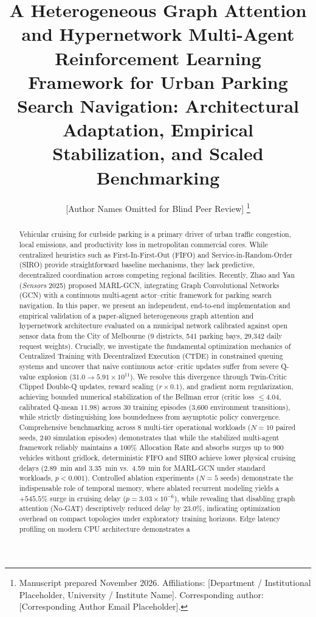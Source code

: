 \documentclass[journal]{IEEEtran}
\begin{document}
\title{A Heterogeneous Graph Attention and Hypernetwork Multi-Agent Reinforcement Learning Framework for Urban Parking Search Navigation: Architectural Adaptation, Empirical Stabilization, and Scaled Benchmarking}

\author{[Author Names Omitted for Blind Peer Review]%
\thanks{Manuscript prepared November 2026. Affiliations: [Department / Institutional Placeholder, University / Institute Name]. Corresponding author: [Corresponding Author Email Placeholder].}}

\maketitle

\begin{abstract}
Vehicular cruising for curbside parking is a primary driver of urban traffic congestion, local emissions, and productivity loss in metropolitan commercial cores. While centralized heuristics such as First-In-First-Out (FIFO) and Service-in-Random-Order (SIRO) provide straightforward baseline mechanisms, they lack predictive, decentralized coordination across competing regional facilities. Recently, Zhao and Yan (\textit{Sensors} 2025) proposed MARL-GCN, integrating Graph Convolutional Networks (GCN) with a continuous multi-agent actor--critic framework for parking search navigation. In this paper, we present an independent, end-to-end implementation and empirical validation of a paper-aligned heterogeneous graph attention and hypernetwork architecture evaluated on a municipal network calibrated against open sensor data from the City of Melbourne (9 districts, 541 parking bays, 29,342 daily request weights). Crucially, we investigate the fundamental optimization mechanics of Centralized Training with Decentralized Execution (CTDE) in constrained queuing systems and uncover that naive continuous actor--critic updates suffer from severe Q-value explosion ($31.0 \to 5.91 \times 10^{11}$). We resolve this divergence through Twin-Critic Clipped Double-Q updates, reward scaling ($r \times 0.1$), and gradient norm regularization, achieving bounded numerical stabilization of the Bellman error (critic loss $\le 4.04$, calibrated Q-mean $11.98$) across 30 training episodes (3,600 environment transitions), while strictly distinguishing loss boundedness from asymptotic policy convergence. Comprehensive benchmarking across 8 multi-tier operational workloads ($N=10$ paired seeds, 240 simulation episodes) demonstrates that while the stabilized multi-agent framework reliably maintains a 100\% Allocation Rate and absorbs surges up to 900 vehicles without gridlock, deterministic FIFO and SIRO achieve lower physical cruising delays (2.89~min and 3.35~min vs.\ 4.59~min for MARL-GCN under standard workloads, $p < 0.001$). Controlled ablation experiments ($N=5$ seeds) demonstrate the indispensable role of temporal memory, where ablated recurrent modeling yields a $+545.5\%$ surge in cruising delay ($p = 3.03 \times 10^{-6}$), while revealing that disabling graph attention (No-GAT) descriptively reduced delay by 23.0\%, indicating optimization overhead on compact topologies under exploratory training horizons. Edge latency profiling on modern CPU architecture demonstrates a 
\end{abstract}
\end{document}
